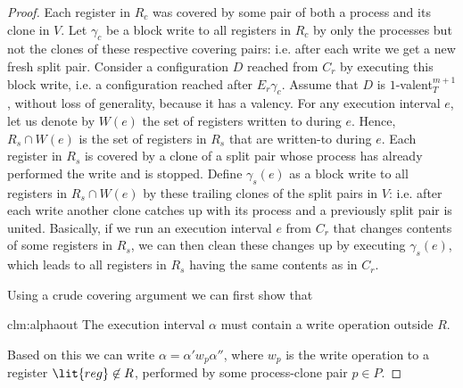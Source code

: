 \begin{proof}
Each register in $R_c$ was covered by some pair of both a process and its clone in $V$.
Let $\gamma_c$ be a block write to all registers in $R_c$ by only the processes but not the clones 
  of these respective covering pairs: i.e. after each write we get a new fresh split pair.
Consider a configuration $D$ reached from $C_r$ by executing this block write, i.e. a configuration reached after $E_r \gamma_c$.
Assume that $D$ is $1$-valent$_T^{m+1}$, without loss of generality, because it has a valency.
For any execution interval $e$, let us denote by $W(e)$ the set of registers written to during $e$.
Hence, $R_s \cap W(e)$ is the set of registers in $R_s$ that are written-to during $e$.
Each register in $R_s$ is covered by a clone of a split pair whose process has already performed the write and is stopped.
Define $\gamma_s(e)$ as a block write to all registers in $R_s \cap W(e)$ by these trailing clones of the split pairs in $V$: 
  i.e. after each write another clone catches up with its process and a previously split pair is united.
Basically, if we run an execution interval $e$ from $C_r$ that changes contents of some registers in $R_s$,
  we can then clean these changes up by executing $\gamma_s(e)$, 
  which leads to all registers in $R_s$ having the same contents as in $C_r$.

Using a crude covering argument we can first show that
\begin{repclaim}{clm:alphaout}
The execution interval $\alpha$ must contain a write operation outside $R$.
\end{repclaim}
\noindent Based on this we can write $\alpha = \alpha' w_p \alpha''$, 
  where $w_p$ is the write operation to a register $\lit{reg} \not \in R$, performed by some process-clone pair $p \in P$.
    

\end{proof}

